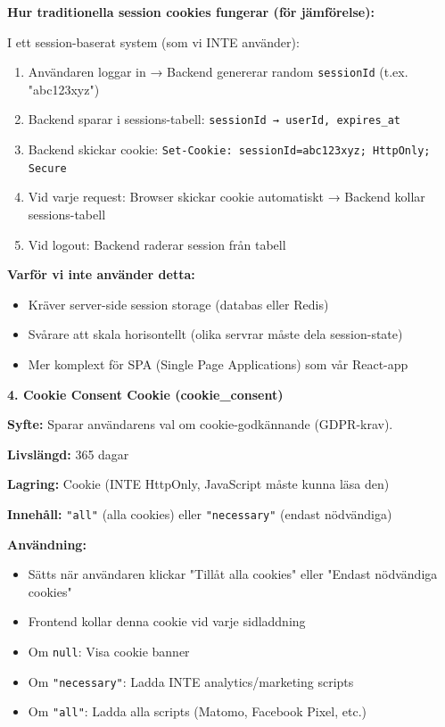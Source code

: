 \documentclass[12pt,a4paper]{article}
\begin{document}
\textbf{Hur traditionella session cookies fungerar (för jämförelse):}

I ett session-baserat system (som vi INTE använder):
\begin{enumerate}[noitemsep]
  \item Användaren loggar in → Backend genererar random \texttt{sessionId} (t.ex. "abc123xyz")
  \item Backend sparar i sessions-tabell: \texttt{sessionId → userId, expires\_at}
  \item Backend skickar cookie: \texttt{Set-Cookie: sessionId=abc123xyz; HttpOnly; Secure}
  \item Vid varje request: Browser skickar cookie automatiskt → Backend kollar sessions-tabell
  \item Vid logout: Backend raderar session från tabell
\end{enumerate}

\textbf{Varför vi inte använder detta:}
\begin{itemize}[noitemsep]
  \item Kräver server-side session storage (databas eller Redis)
  \item Svårare att skala horisontellt (olika servrar måste dela session-state)
  \item Mer komplext för SPA (Single Page Applications) som vår React-app
\end{itemize}

\textbf{4. Cookie Consent Cookie (cookie\_consent)}

\textbf{Syfte:} Sparar användarens val om cookie-godkännande (GDPR-krav).

\textbf{Livslängd:} 365 dagar

\textbf{Lagring:} Cookie (INTE HttpOnly, JavaScript måste kunna läsa den)

\textbf{Innehåll:} \texttt{"all"} (alla cookies) eller \texttt{"necessary"} (endast nödvändiga)

\textbf{Användning:}
\begin{itemize}[noitemsep]
  \item Sätts när användaren klickar "Tillåt alla cookies" eller "Endast nödvändiga cookies"
  \item Frontend kollar denna cookie vid varje sidladdning
  \item Om \texttt{null}: Visa cookie banner
  \item Om \texttt{"necessary"}: Ladda INTE analytics/marketing scripts
  \item Om \texttt{"all"}: Ladda alla scripts (Matomo, Facebook Pixel, etc.)
\end{itemize}
\end{document}
